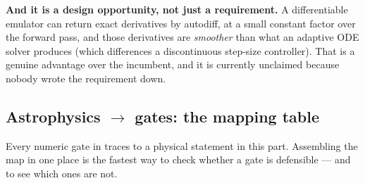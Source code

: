 \textbf{And it is a design opportunity, not just a requirement.} A
differentiable emulator can return exact derivatives by autodiff, at a small
constant factor over the forward pass, and those derivatives are
\emph{smoother} than what an adaptive ODE solver produces (which differences a
discontinuous step-size controller). That is a genuine advantage over the
incumbent, and it is currently unclaimed because nobody wrote the requirement
down.

\subsection{Astrophysics \texorpdfstring{$\to$}{->} gates: the mapping table}
\label{sec:gatemap}

Every numeric gate in  traces to a physical statement in this
part. Assembling the map in one place is the fastest way to check whether a
gate is defensible --- and to see which ones are not.

